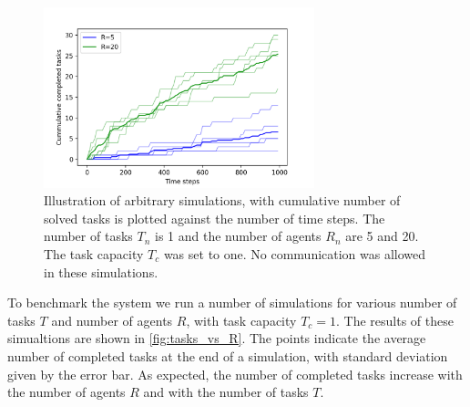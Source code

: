 \documentclass[11pt]{article}
\begin{document}
    \begin{figure}
        \centering
        \includegraphics[width=0.7\textwidth]{figures/some_vs_many.png}
        \caption{
            Illustration of arbitrary simulations, with cumulative number 
            of solved tasks is plotted against the number of time steps.
            The number of tasks $T_n$ is 1 and the number of agents
            $R_n$ are 5 and 20. The task capacity $T_c$ was set to one.
            No communication was allowed in these simulations.
        }
        \label{fig:some_vs_many}
    \end{figure}

    To benchmark the system we run a number of simulations for various number 
    of tasks $T$ and number of agents $R$, with task capacity $T_c=1$. The 
    results of these simualtions are shown in \autoref{fig:tasks_vs_R}.
    The points indicate the average number of completed tasks at the end 
    of a simulation, with standard deviation given by the error bar.
    As expected, the number of completed tasks increase with the number 
    of agents $R$ and with the number of tasks $T$.
\end{document}
